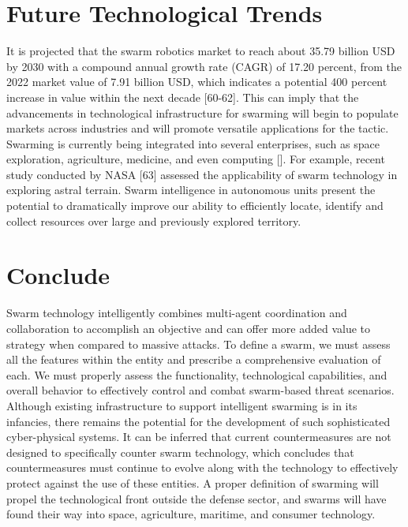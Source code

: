 \section*{Future Technological Trends}
It is projected that the swarm robotics market to reach about 35.79 billion USD by 2030 with a compound annual growth rate (CAGR) of 17.20 percent, from the 2022 market value of 7.91 billion USD, which indicates a potential 400 percent increase in value within the next decade [60-62]. This can imply that the advancements in technological infrastructure for swarming will begin to populate markets across industries and will promote versatile applications for the tactic. Swarming is currently being integrated into several enterprises, such as space exploration, agriculture, medicine, and even computing []. For example, recent study conducted by NASA [63] assessed the applicability of swarm technology in exploring astral terrain. Swarm intelligence in autonomous units present the potential to dramatically improve our ability to efficiently locate, identify and collect resources over large and previously explored territory.

\section*{Conclude}
Swarm technology intelligently combines multi-agent coordination and collaboration to accomplish an objective and can offer more added value to strategy when compared to massive attacks.  To define a swarm, we must assess all the features within the entity and prescribe a comprehensive evaluation of each. We must properly assess the functionality, technological capabilities, and overall behavior to effectively control and combat swarm-based threat scenarios. Although existing infrastructure to support intelligent swarming is in its infancies, there remains the potential for the development of such sophisticated cyber-physical systems. It can be inferred that current countermeasures are not designed to specifically counter swarm technology, which concludes that countermeasures must continue to evolve along with the technology to effectively protect against the use of these entities. A proper definition of swarming will propel the technological front outside the defense sector, and swarms will have found their way into space, agriculture, maritime, and consumer technology.